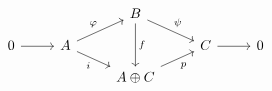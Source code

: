 \documentclass{article}
\begin{document}
    \begin{equation*}
        \begin{tikzcd}[row sep=0.3cm]
            & & B \ar[dr, "\psi"] \ar[dd, "f"] \\
            0 \ar[r] & A\ar[ur, "\phi"] \ar[dr, "i"'] & & C \ar[r] & 0 \\
            & & A\oplus C \ar[ur, "p"']
        \end{tikzcd}
    \end{equation*}
\end{document}

